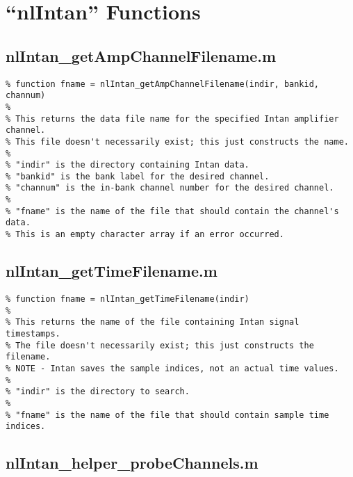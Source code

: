 \chapter{``nlIntan'' Functions}
\label{sect-intan}

\section{nlIntan\_getAmpChannelFilename.m}

\begin{verbatim}
% function fname = nlIntan_getAmpChannelFilename(indir, bankid, channum)
%
% This returns the data file name for the specified Intan amplifier channel.
% This file doesn't necessarily exist; this just constructs the name.
%
% "indir" is the directory containing Intan data.
% "bankid" is the bank label for the desired channel.
% "channum" is the in-bank channel number for the desired channel.
%
% "fname" is the name of the file that should contain the channel's data.
% This is an empty character array if an error occurred.
\end{verbatim}

\section{nlIntan\_getTimeFilename.m}

\begin{verbatim}
% function fname = nlIntan_getTimeFilename(indir)
%
% This returns the name of the file containing Intan signal timestamps.
% The file doesn't necessarily exist; this just constructs the filename.
% NOTE - Intan saves the sample indices, not an actual time values.
%
% "indir" is the directory to search.
%
% "fname" is the name of the file that should contain sample time indices.
\end{verbatim}

\section{nlIntan\_helper\_probeChannels.m}

